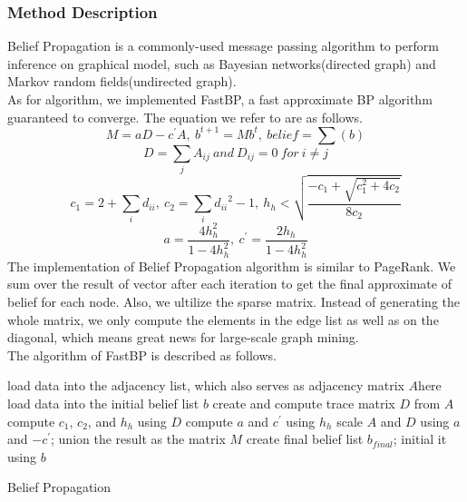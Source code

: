 \subsubsection{Method Description}
Belief Propagation is a commonly-used message passing algorithm to perform inference on graphical model, such as Bayesian networks(directed graph) and Markov random fields(undirected graph). \\
As for algorithm, we implemented FastBP\cite{koutra2011unifying}, a fast approximate BP algorithm guaranteed to converge. The equation we refer to are as follows.
\[M=aD − c^{′}A,\ b^{t+1}=Mb^t,\ belief=\sum(b)\]
\[D=\sum_j{A_{ij}}\ and\ D_{ij}=0\ for\ i \ne j\]
\[c_1 = 2+\sum_i{d_{ii}},\ c_2=\sum_i{d_{ii}}^2-1,\ h_h < \sqrt{\frac{-c_1+\sqrt{c_1^2+4c_2}}{8c_2}}\]
\[a=\frac{4h_h^2}{1-4h_h^2},\ c^{'}=\frac{2h_h}{1-4h_h^2}\]
The implementation of Belief Propagation algorithm is similar to PageRank. We sum over the result of vector after each iteration to get the final approximate of belief for each node. Also, we ultilize the sparse matrix. Instead of generating the whole matrix, we only compute the elements in the edge list as well as on the diagonal, which means great news for large-scale graph mining. \\
The algorithm of FastBP is described as follows.
\begin{algorithm}[htbp]
	\SetAlgoLined
	load data into the adjacency list, which also serves as adjacency matrix $A$here\;
	load data into the initial belief list $b$\;
	create and compute trace matrix $D$ from $A$\;
	compute $c_1$, $c_2$, and $h_h$ using $D$\;
	compute $a$ and $c^{'}$ using $h_h$ \;
	scale $A$ and $D$ using $a$ and $-c^{'}$; union the result as the matrix $M$\;
	create final belief list $b_{final}$; initial it using $b$\;
	\caption{Belief Propagation}
	\label{bp}
\end{algorithm}

